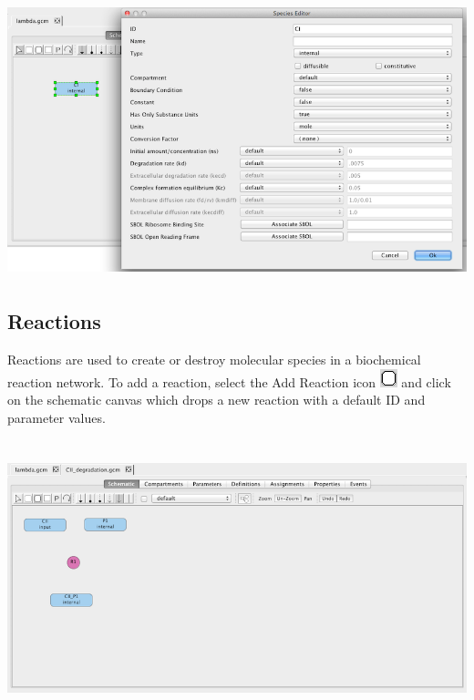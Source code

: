 \documentclass[titlepage,11pt]{article}
\begin{document}
\begin{center}
\includegraphics[height=80mm]{screenshots/species}
\end{center}

\subsection{\label{Reactions}Reactions}

\noindent
Reactions are used to create or destroy molecular species in a biochemical reaction network.  
To add a reaction, select the Add Reaction icon \includegraphics{../gui/icons/modelview/add_reaction_selected} and click on the schematic canvas which drops a new reaction with a default ID and parameter values.  

\begin{center}
\includegraphics[height=80mm]{screenshots/reaction}
\end{center}
\end{document}
